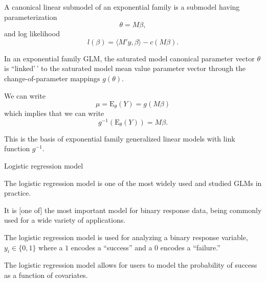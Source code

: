 \documentclass[
  ignorenonframetext,
]{beamer}
\begin{document}
\begin{frame}{}
\protect\hypertarget{section}{}
A canonical linear submodel of an exponential family is a submodel
having parameterization \[
  \theta = M\beta,
\] and log likelihood \begin{equation} \label{subloglike}
  l(\beta) = \langle M'y, \beta \rangle - c(M\beta).
\end{equation}

In an exponential family GLM, the saturated model canonical parameter
vector \(\theta\) is ``linked'\,' to the saturated model mean value
parameter vector through the change-of-parameter mappings \(g(\theta)\).

\vspace{12pt}

We can write \[
 \mu = \text{E}_\theta(Y) = g(M\beta) 
\] which implies that we can write \[
  g^{-1}\left(\text{E}_\theta(Y)\right) = M\beta.
\]

\vspace{12pt}

This is the basis of exponential family generalized linear models with
link function \(g^{-1}\).
\end{frame}

\begin{frame}{Logistic regression model}
\protect\hypertarget{logistic-regression-model}{}
\vspace{12pt}

The logistic regression model is one of the most widely used and studied
GLMs in practice.

\vspace{12pt}

It is {[}one of{]} the most important model for binary response data,
being commonly used for a wide variety of applications.

\vspace{12pt}

The logistic regression model is used for analyzing a binary response
variable, \(y_i \in \{0,1\}\) where a \(1\) encodes a ``success'' and a
0 encodes a ``failure.''

\vspace{12pt}

The logistic regression model allows for users to model the probability
of success as a function of covariates.
\end{frame}
\end{document}
